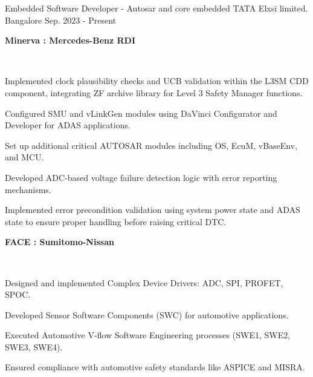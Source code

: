

\begin{cventries}

  \cventry
    {Embedded Software Developer - Autosar and core embedded} %
    {TATA Elxsi limited.} %
    {Bangalore} %
    {Sep. 2023 - Present} %
    {
       {\textbf{Minerva : Mercedes-Benz RDI}}
      \begin{cvitems} %
        \ {\textbf{      }}
        \item %
        \item {Implemented clock plausibility checks and UCB validation within the L3SM CDD component, integrating ZF archive library for Level 3 Safety Manager functions.}
  \item {Configured SMU and vLinkGen modules using DaVinci Configurator and Developer for ADAS applications.}
  \item {Set up additional critical AUTOSAR modules including OS, EcuM, vBaseEnv, and MCU.}
  \item {Developed ADC-based voltage failure detection logic with error reporting mechanisms.}
  \item {Implemented error precondition validation using system power state and ADAS state to ensure proper handling before raising critical DTC.}
        \item %
      \end{cvitems}
      {\textbf{FACE : Sumitomo-Nissan}}
      \begin{cvitems} %
        \ {\textbf{      }}
        \item %
        \item {Designed and implemented Complex Device Drivers: ADC, SPI, PROFET, SPOC.}
        \item {Developed Sensor Software Components (SWC) for automotive applications.}
        \item {Executed Automotive V-flow Software Engineering processes (SWE1, SWE2, SWE3, SWE4).}
        \item {Ensured compliance with automotive safety standards like ASPICE and MISRA.}
      \end{cvitems}
    }
 

\end{cventries}

